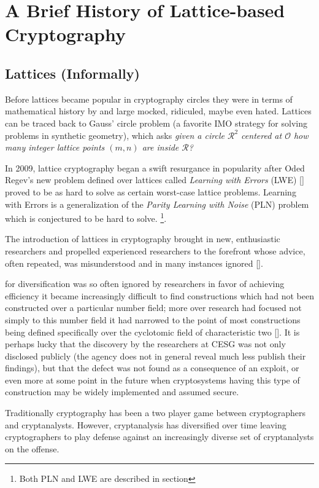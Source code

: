 \section{A Brief History of Lattice-based Cryptography}


\subsection*{Lattices (Informally)}

Before lattices became popular in cryptography circles they were in terms of mathematical history by and large mocked, ridiculed, maybe even hated. Lattices can be traced back to Gauss' circle problem (a favorite IMO strategy for solving problems in synthetic geometry), which asks \textit{given a circle $\mathcal{R}^{2}$ centered at $\mathcal{O}$ how many integer lattice points $(m,n)$ are inside $\mathcal{R}$?}


In 2009, lattice cryptography began a swift resurgance in popularity after Oded Regev's new problem defined over lattices called \emph{Learning with Errors} (LWE) [] proved to be as hard to solve as certain worst-case lattice problems. Learning with Errors is a generalization of the \emph{Parity Learning with Noise} (PLN) problem which is conjectured to be hard to solve. \footnote{Both PLN and LWE are described in section }.
 
 

The introduction of lattices in cryptography brought in new, enthusiastic researchers and propelled experienced researchers to the forefront whose advice, often repeated, was misunderstood and in many instances ignored [].


 for diversification was so often ignored by researchers in favor of
achieving efficiency it became increasingly difficult to find
constructions which had not been constructed over a particular number
field; more over research had focused not simply to this number field
it had narrowed to the point of most constructions being defined
specifically over the cyclotomic field of characteristic two [].
It is perhaps lucky that the discovery by the researchers at CESG was
not only disclosed publicly (the agency does not in general reveal much
less publish their findings), but that the defect was not found as a
consequence of an exploit, or even more at some point in the future
when cryptosystems having this type of construction may be widely
implemented and assumed secure.

Traditionally cryptography has been a two player game between
cryptographers and cryptanalysts. However, cryptanalysis has
diversified over time leaving cryptographers to play defense against an
increasingly diverse set of cryptanalysts on the offense.


